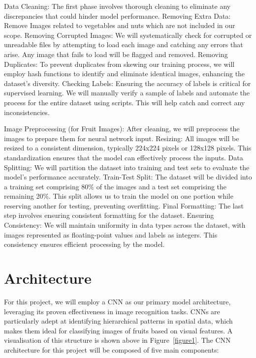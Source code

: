 \documentclass{article} %
\begin{document}
Data Cleaning: The first phase involves thorough cleaning to eliminate any discrepancies that could hinder model performance.
Removing Extra Data: Remove Images related to vegetables and nuts which are not included in our scope.
Removing Corrupted Images: We will systematically check for corrupted or unreadable files by attempting to load each image and catching any errors that arise. Any image that fails to load will be flagged and removed.
Removing Duplicates: To prevent duplicates from skewing our training process, we will employ hash functions to identify and eliminate identical images, enhancing the dataset's diversity.
Checking Labels: Ensuring the accuracy of labels is critical for supervised learning. We will manually verify a sample of labels and automate the process for the entire dataset using scripts. This will help catch and correct any inconsistencies.

Image Preprocessing (for Fruit Images): After cleaning, we will preprocess the images to prepare them for neural network input.
Resizing: All images will be resized to a consistent dimension, typically 224x224 pixels or 128x128 pixels. This standardization ensures that the model can effectively process the inputs.
Data Splitting: We will partition the dataset into training and test sets to evaluate the model's performance accurately.
Train-Test Split: The dataset will be divided into a training set comprising 80\% of the images and a test set comprising the remaining 20\%. This split allows us to train the model on one portion while reserving another for testing, preventing overfitting.
Final Formatting: The last step involves ensuring consistent formatting for the dataset.
Ensuring Consistency: We will maintain uniformity in data types across the dataset, with images represented as floating-point values and labels as integers. This consistency ensures efficient processing by the model.


\section{Architecture}
\label{sec:Architecture}
For this project, we will employ a CNN as our primary model architecture, leveraging its proven effectiveness in image recognition tasks. CNNs are particularly adept at identifying hierarchical patterns in spatial data, which makes them ideal for classifying images of fruits based on visual features. A visualisation of this structure is shown above in Figure~\ref{figure1}. The CNN architecture for this project will be composed of five main components:
\end{document}
